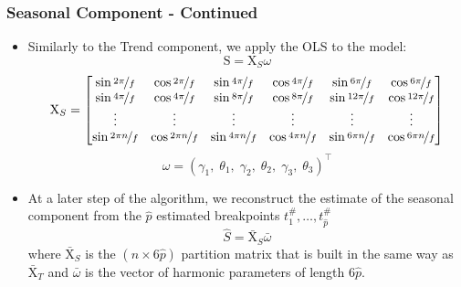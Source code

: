 \documentclass[presentation.tex]{subfiles}
\begin{document}
\begin{frame}
  \frametitle{Seasonal Component - Continued}
  \begin{itemize}
  \item
    Similarly to the Trend component, we apply the OLS to the model:
    \[
    \mathrm{S} = \mathrm{X}_S \omega
    \]
    \[
  \mathrm{X}_{S} =
  \begin{bmatrix}
    \sin\nicefrac{2 \pi}{f} & \cos\nicefrac{2 \pi}{f} & \sin\nicefrac{4 \pi}{f} & \cos\nicefrac{4
      \pi}{f} &  \sin\nicefrac{6 \pi}{f} & \cos\nicefrac{6 \pi}{f} \\
    \sin\nicefrac{4 \pi}{f} & \cos\nicefrac{4 \pi}{f} & \sin\nicefrac{8 \pi}{f} & \cos\nicefrac{8
      \pi}{f} &  \sin\nicefrac{12 \pi}{f} & \cos\nicefrac{12 \pi}{f} \\
    \vdots & \vdots  & \vdots & \vdots & \vdots & \vdots \\
    \sin\nicefrac{2 \pi n}{f} & \cos\nicefrac{2 \pi n}{f} & \sin\nicefrac{4 \pi n}{f} &
    \cos\nicefrac{4 \pi n}{f} &  \sin\nicefrac{6 \pi n}{f} & \cos\nicefrac{6 \pi n}{f}
  \end{bmatrix}
  \]
  \[
  \omega = (\gamma_1, \; \theta_1,\;  \gamma_2,\;  \theta_2,\; \gamma_3,\;
  \theta_3)^{\top}
  \]
\item At a later step of the algorithm, we reconstruct the estimate of the seasonal
  component from the $\hat{p}$ estimated breakpoints $t_1^{\#},\hdots, t_{\hat{p}}^{\#}$
\[
\hat{S} = \bar{\mathrm{X}}_S \bar{\omega}
\]
where $\bar{\mathrm{X}}_S$ is the $(n \times 6\hat{p})$ partition matrix that is
built in the same way as $\bar{\mathrm{X}}_T$ and $\bar{\omega}$ is the vector of harmonic parameters
 of length $6\hat{p}$.
  \end{itemize}
\end{frame}
\end{document}
